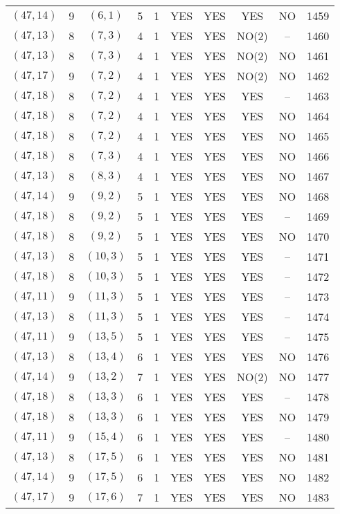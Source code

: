 \begin{longtable}{|c|c|c|c|c|c|c|c|c|c|}
$(47, 14)$ & 9 & $(6, 1)$ & 5 & 1 & YES & YES & YES & NO & 1459\\
$(47, 13)$ & 8 & $(7, 3)$ & 4 & 1 & YES & YES & NO(2) & -- & 1460\\
$(47, 13)$ & 8 & $(7, 3)$ & 4 & 1 & YES & YES & NO(2) & NO & 1461\\
$(47, 17)$ & 9 & $(7, 2)$ & 4 & 1 & YES & YES & NO(2) & NO & 1462\\
$(47, 18)$ & 8 & $(7, 2)$ & 4 & 1 & YES & YES & YES & -- & 1463\\
$(47, 18)$ & 8 & $(7, 2)$ & 4 & 1 & YES & YES & YES & NO & 1464\\
$(47, 18)$ & 8 & $(7, 2)$ & 4 & 1 & YES & YES & YES & NO & 1465\\
$(47, 18)$ & 8 & $(7, 3)$ & 4 & 1 & YES & YES & YES & NO & 1466\\
$(47, 13)$ & 8 & $(8, 3)$ & 4 & 1 & YES & YES & YES & NO & 1467\\
$(47, 14)$ & 9 & $(9, 2)$ & 5 & 1 & YES & YES & YES & NO & 1468\\
$(47, 18)$ & 8 & $(9, 2)$ & 5 & 1 & YES & YES & YES & -- & 1469\\
$(47, 18)$ & 8 & $(9, 2)$ & 5 & 1 & YES & YES & YES & NO & 1470\\
$(47, 13)$ & 8 & $(10, 3)$ & 5 & 1 & YES & YES & YES & -- & 1471\\
$(47, 18)$ & 8 & $(10, 3)$ & 5 & 1 & YES & YES & YES & -- & 1472\\
$(47, 11)$ & 9 & $(11, 3)$ & 5 & 1 & YES & YES & YES & -- & 1473\\
$(47, 13)$ & 8 & $(11, 3)$ & 5 & 1 & YES & YES & YES & -- & 1474\\
$(47, 11)$ & 9 & $(13, 5)$ & 5 & 1 & YES & YES & YES & -- & 1475\\
$(47, 13)$ & 8 & $(13, 4)$ & 6 & 1 & YES & YES & YES & NO & 1476\\
$(47, 14)$ & 9 & $(13, 2)$ & 7 & 1 & YES & YES & NO(2) & NO & 1477\\
$(47, 18)$ & 8 & $(13, 3)$ & 6 & 1 & YES & YES & YES & -- & 1478\\
$(47, 18)$ & 8 & $(13, 3)$ & 6 & 1 & YES & YES & YES & NO & 1479\\
$(47, 11)$ & 9 & $(15, 4)$ & 6 & 1 & YES & YES & YES & -- & 1480\\
$(47, 13)$ & 8 & $(17, 5)$ & 6 & 1 & YES & YES & YES & NO & 1481\\
$(47, 14)$ & 9 & $(17, 5)$ & 6 & 1 & YES & YES & YES & NO & 1482\\
$(47, 17)$ & 9 & $(17, 6)$ & 7 & 1 & YES & YES & YES & NO & 1483\\

\end{longtable}
